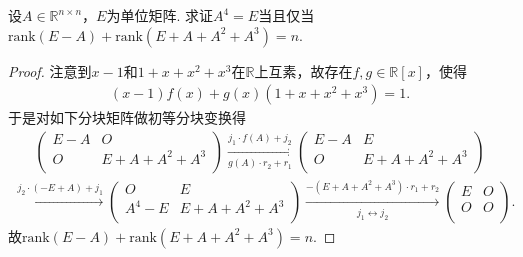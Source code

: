 \documentclass[../../main.tex]{subfiles}
\begin{document}
\begin{example}
设$A \in \mathbb{R}^{n \times n}$，$E$为单位矩阵. 求证$A^4 = E$当且仅当$\text{rank}(E - A) + \text{rank}\left(E + A + A^2 + A^3\right) = n$.
\end{example}
\begin{proof}
注意到$x-1$和$1+x+x^2+x^3$在$\mathbb{R}$上互素，故存在$f,g\in \mathbb{R}[x]$，使得
\begin{align*}
(x-1)f(x) + g(x)(1+x+x^2+x^3) = 1.
\end{align*}
于是对如下分块矩阵做初等分块变换得
\begin{align*}
\left( \begin{matrix}
E-A&		O\\
O&		E+A+A^2+A^3\\
\end{matrix} \right) \xrightarrow[g(A) \cdot r_2+r_1]{j_1 \cdot f(A) +j_2}\left( \begin{matrix}
E-A&		E\\
O&		E+A+A^2+A^3\\
\end{matrix} \right) 
\end{align*}
\begin{align*}
\xrightarrow{j_2 \cdot (-E+A) +j_1}\left( \begin{matrix}
O&		E\\
A^4-E&		E+A+A^2+A^3\\
\end{matrix} \right) \xrightarrow[j_1 \longleftrightarrow j_2]{-(E+A+A^2+A^3) \cdot r_1+r_2}\left( \begin{matrix}
E&		O\\
O&		O\\
\end{matrix} \right).
\end{align*}
故$\text{rank}(E-A) + \text{rank}(E+A+A^2+A^3) = n.$

\end{proof}
\end{document}
